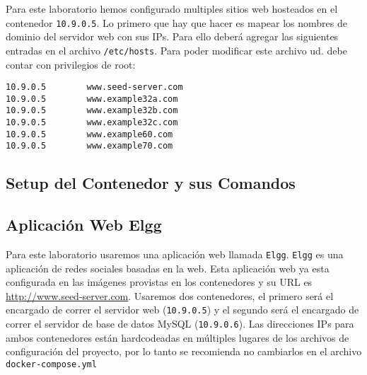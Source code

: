 Para este laboratorio hemos configurado multiples sitios web hosteados en el contenedor \texttt{10.9.0.5}. Lo primero que hay que hacer es mapear los nombres de dominio del servidor web con sus IPs. Para ello deberá agregar las siguientes entradas en el archivo \texttt{/etc/hosts}.
Para poder modificar este archivo ud. debe contar con privilegios de root:

\begin{lstlisting}
10.9.0.5        www.seed-server.com
10.9.0.5        www.example32a.com
10.9.0.5        www.example32b.com
10.9.0.5        www.example32c.com
10.9.0.5        www.example60.com
10.9.0.5        www.example70.com
\end{lstlisting}
 

\subsection{Setup del Contenedor y sus Comandos}





\subsection{Aplicación Web Elgg}

Para este laboratorio usaremos una aplicación web llamada {\tt Elgg}.
{\tt Elgg} es una aplicación de redes sociales basadas en la web.
Esta aplicación web ya esta configurada en las imágenes provistas en los contenedores y su URL es \url{http://www.seed-server.com}.
Usaremos dos contenedores, el primero será el encargado de correr el servidor web  (\texttt{10.9.0.5}) y el segundo será el encargado de correr el servidor de base de datos MySQL (\texttt{10.9.0.6}). 
Las direcciones IPs para ambos contenedores están hardcodeadas en múltiples lugares de los archivos de configuración del proyecto, por lo tanto se recomienda no cambiarlos en el archivo \texttt{docker-compose.yml}







